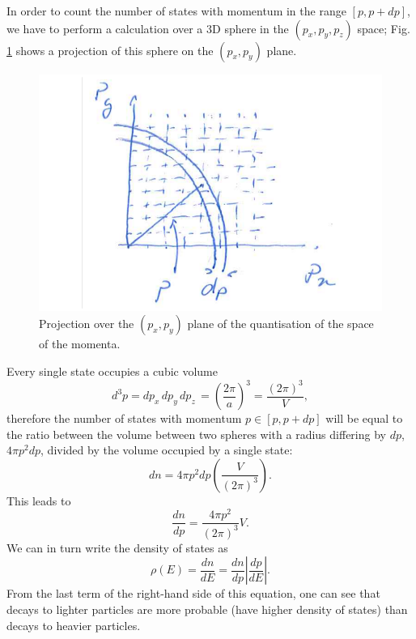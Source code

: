 In order to count the number of states with momentum in the range $[p,p+dp]$, we have to perform a calculation over a 3D sphere in the $(p_x,p_y,p_z)$ space;  Fig. \ref{quantum-scattering:fig9}  shows a projection of this sphere on the $(p_x,p_y)$ plane.
\begin{figure}[h]
    \centering
    \includegraphics[scale=0.4]{Figures/qscat7}
    \caption{Projection over the $(p_x,p_y)$ plane of the quantisation of the space of the momenta.}
    \label{quantum-scattering:fig9}
\end{figure}
Every single state occupies a cubic volume
\begin{equation*}
    d^3p = dp_x\,dp_y\,dp_z\, = \left(\frac{2\pi}{a}\right)^3 = \frac{(2\pi)^3}{V},
\end{equation*}
therefore the number of states with momentum $p \in [p,p+dp]$ will be equal to the ratio between the volume between two spheres with a radius differing by $dp$, $4\pi p^2dp$, divided by the volume occupied by a single state:
\begin{equation*}
    dn = 4\pi p^2 dp\left(\frac{V}{(2\pi)^3}\right).
\end{equation*}
This leads to
\begin{equation*}
    \frac{dn}{dp} = \frac{4\pi p^2}{(2\pi)^3}V.
\end{equation*}
We can in turn write the density of states as
\begin{equation}\label{eq:dennedp}
    \rho(E) = \frac{dn}{dE} = \frac{dn}{dp}\left|\frac{dp}{dE}\right|.
\end{equation}
From the last term of the right-hand side of this equation, one can see that decays to lighter particles are more probable (have higher density of states) than decays to heavier particles.

